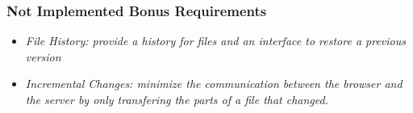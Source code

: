 \subsubsection {Not Implemented Bonus Requirements}
\begin{itemize}
  \item \emph{File History: provide a history for files and an interface to
  restore a previous version}
 \item \emph{Incremental Changes: minimize the communication between the browser
 and the server by only transfering the parts of a file that changed.}
\end{itemize}

